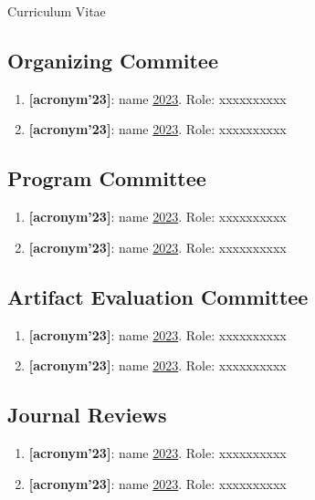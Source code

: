 \documentclass[11pt,a4paper]{article}
\begin{document}
\begin{cv}{Curriculum Vitae}
\subsection{Organizing Commitee}
\begin{cvlist}{}
\item \begin{enumerate}[leftmargin=-2cm]
        \item \textbf{[acronym'23]}: name  \href{about:blank}{2023}. Role: xxxxxxxxxx
        \item \textbf{[acronym'23]}: name  \href{about:blank}{2023}. Role: xxxxxxxxxx
    \end{enumerate}
\end{cvlist}
\subsection{Program Committee}
\begin{cvlist}{}
\item \begin{enumerate}[leftmargin=-2cm]
        \item \textbf{[acronym'23]}: name  \href{about:blank}{2023}. Role: xxxxxxxxxx
        \item \textbf{[acronym'23]}: name  \href{about:blank}{2023}. Role: xxxxxxxxxx
    \end{enumerate}
\end{cvlist}
\subsection{Artifact Evaluation Committee}
\begin{cvlist}{}
\item \begin{enumerate}[leftmargin=-2cm]
        \item \textbf{[acronym'23]}: name  \href{about:blank}{2023}. Role: xxxxxxxxxx
        \item \textbf{[acronym'23]}: name  \href{about:blank}{2023}. Role: xxxxxxxxxx
    \end{enumerate}
\end{cvlist}
\subsection{Journal Reviews}
\begin{cvlist}{}
\item \begin{enumerate}[leftmargin=-2cm]
        \item \textbf{[acronym'23]}: name  \href{about:blank}{2023}. Role: xxxxxxxxxx
        \item \textbf{[acronym'23]}: name  \href{about:blank}{2023}. Role: xxxxxxxxxx
    \end{enumerate}
\end{cvlist}

\end{cv}
\end{document}
